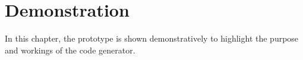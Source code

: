\newpage
\section{Demonstration}
In this chapter, the prototype is shown demonstratively to highlight the purpose and workings of the code generator.